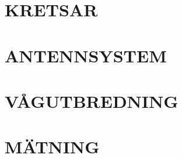 \documentclass[a4paper,twoside,openright]{book}
\begin{document}
\chapter{KRETSAR}













%
%
%
%
%
%
%
%
%

%
%

\chapter{ANTENNSYSTEM}







\chapter{VÅGUTBREDNING}
\label{vågutbredning}








\chapter{MÄTNING}



%
%
%
%
\end{document}
